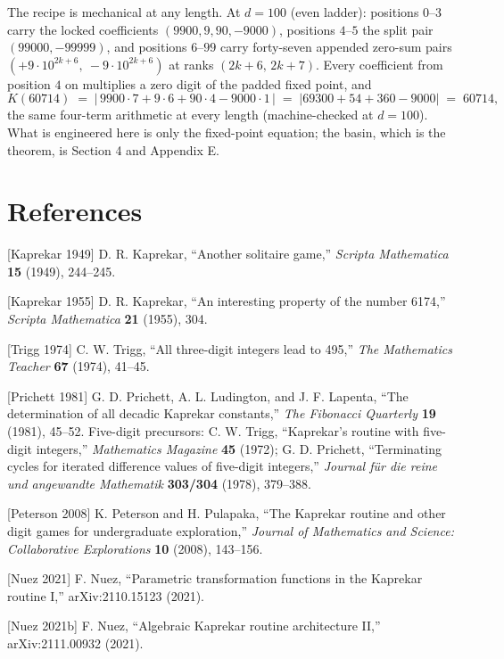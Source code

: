 \documentclass[11pt,letterpaper]{article}
\theoremstyle{paperstyle}
\theoremstyle{paperstyledef}
\theoremstyle{paperstylerem}
\begin{document}
The recipe is mechanical at any length. At \(d = 100\) (even ladder): positions \(0\)--\(3\) carry the locked coefficients \((9900, 9, 90, -9000)\), positions \(4\)--\(5\) the split pair \((99000, -99999)\), and positions \(6\)--\(99\) carry forty-seven appended zero-sum pairs \((+9 \cdot 10^{2k+6},\ -9 \cdot 10^{2k+6})\) at ranks \((2k+6,\, 2k+7)\). Every coefficient from position \(4\) on multiplies a zero digit of the padded fixed point, and \[K(60714) \;=\; |\,9900 \cdot 7 + 9 \cdot 6 + 90 \cdot 4 - 9000 \cdot 1\,| \;=\; |69300 + 54 + 360 - 9000| \;=\; 60714,\] the same four-term arithmetic at every length (machine-checked at \(d = 100\)). What is engineered here is only the fixed-point equation; the basin, which is the theorem, is Section 4 and Appendix E.

\section*{References}\label{references}

{[}Kaprekar 1949{]} D. R. Kaprekar, ``Another solitaire game,'' \emph{Scripta Mathematica} \textbf{15} (1949), 244--245.

{[}Kaprekar 1955{]} D. R. Kaprekar, ``An interesting property of the number 6174,'' \emph{Scripta Mathematica} \textbf{21} (1955), 304.

{[}Trigg 1974{]} C. W. Trigg, ``All three-digit integers lead to 495,'' \emph{The Mathematics Teacher} \textbf{67} (1974), 41--45.

{[}Prichett 1981{]} G. D. Prichett, A. L. Ludington, and J. F. Lapenta, ``The determination of all decadic Kaprekar constants,'' \emph{The Fibonacci Quarterly} \textbf{19} (1981), 45--52. Five-digit precursors: C. W. Trigg, ``Kaprekar's routine with five-digit integers,'' \emph{Mathematics Magazine} \textbf{45} (1972); G. D. Prichett, ``Terminating cycles for iterated difference values of five-digit integers,'' \emph{Journal für die reine und angewandte Mathematik} \textbf{303/304} (1978), 379--388.

{[}Peterson 2008{]} K. Peterson and H. Pulapaka, ``The Kaprekar routine and other digit games for undergraduate exploration,'' \emph{Journal of Mathematics and Science: Collaborative Explorations} \textbf{10} (2008), 143--156.

{[}Nuez 2021{]} F. Nuez, ``Parametric transformation functions in the Kaprekar routine I,'' arXiv:2110.15123 (2021).

{[}Nuez 2021b{]} F. Nuez, ``Algebraic Kaprekar routine architecture II,'' arXiv:2111.00932 (2021).
\end{document}
